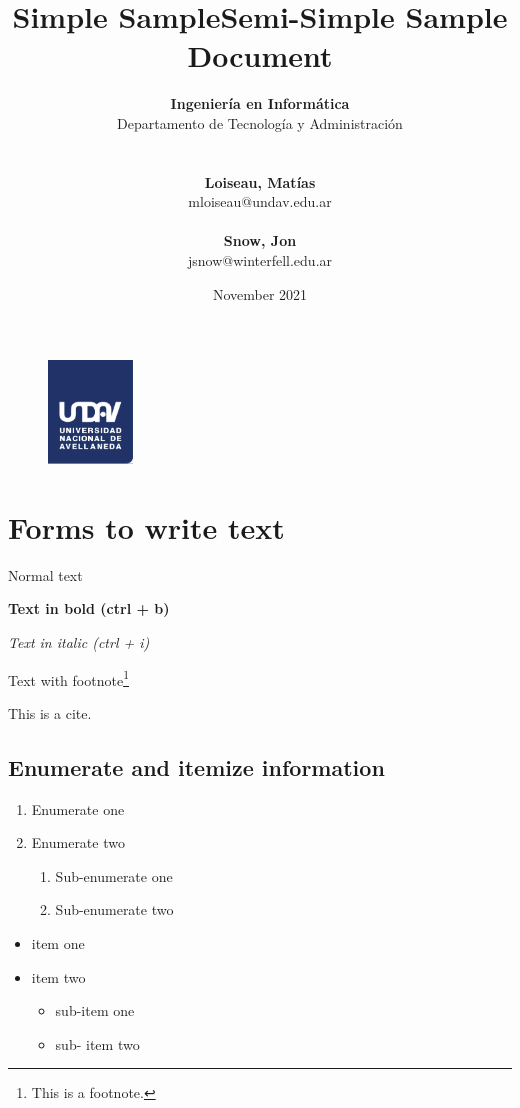 \documentclass{article} %
\title{Simple Sample} %
\author{
	\textbf{Ingeniería en Informática}\\
	Departamento de Tecnología y Administración\\
	\\~\\
	\textbf{Loiseau, Matías}\\
	mloiseau@undav.edu.ar
 	\\~\\
 	\textbf{Snow, Jon}\\
 	jsnow@winterfell.edu.ar
}
\title{Semi-Simple Sample Document}
\date{November 2021}
\begin{document}

\begin{figure}
\centering
	\includegraphics[width=0.2\textwidth]{images/undav-logo}
	\label{fig:undav-logo}
\end{figure}
\maketitle %

\thispagestyle{empty} %
\cleardoublepage

\cleardoublepage
\tableofcontents %
\cleardoublepage

\section{Forms to write text} %
Normal text

\textbf{Text in bold (ctrl + b)}

\textit{Text in italic (ctrl + i)}

Text with footnote\footnote{This is a footnote.}

This is a cite\cite{knn}.

\subsection{Enumerate and itemize information}

\begin{enumerate}
	\item Enumerate one
	\item Enumerate two
	\begin{enumerate}
		\item Sub-enumerate one
		\item Sub-enumerate two
	\end{enumerate}
\end{enumerate}

\begin{itemize}
	\item item one
	\item item two
	\begin{itemize}
		\item sub-item one
		\item sub-	item two
	\end{itemize}
\end{itemize}
\end{document}
